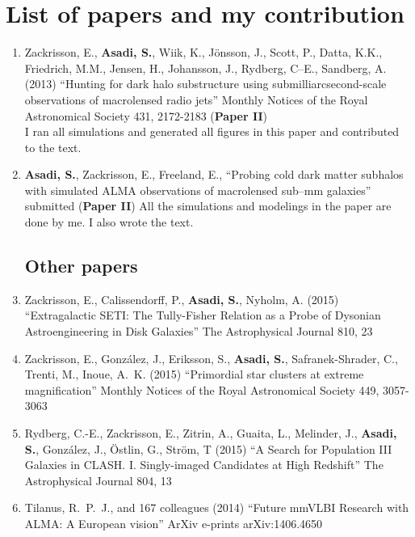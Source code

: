 \documentclass[a4wide,12pt]{book}
\begin{document}
\clearpage

\thispagestyle{empty}

\section*{List of papers and my contribution}
  \begin{enumerate}[I]
    \subsection*{Included in this thesis}
      \item
      Zackrisson, E., {\bf Asadi, S.}, Wiik, K., J{\"o}nsson, J., Scott, P., Datta, K.K., Friedrich, M.M., Jensen, H., Johansson, J., Rydberg, C--E., Sandberg, A. (2013) ``Hunting for dark halo substructure using  submilliarcsecond-scale observations of macrolensed radio jets'' Monthly Notices of the Royal Astronomical Society 431, 2172-2183 ({\bf Paper II})\\
      I ran all simulations and generated all figures in this paper and contributed to the text.
      \item 
      {\bf Asadi, S.}, Zackrisson, E., Freeland, E., ``Probing cold dark matter subhalos with simulated ALMA observations of macrolensed sub–mm galaxies'' submitted ({\bf Paper II})
      All the simulations and modelings in the paper are done by me. I also wrote the text.
    \subsection*{Other papers}
      \item
      Zackrisson, E., Calissendorff, P., {\bf Asadi, S.}, Nyholm, A. (2015) ``Extragalactic SETI: The Tully-Fisher Relation as a Probe of Dysonian Astroengineering in Disk Galaxies'' The Astrophysical Journal 810, 23
      \item
      Zackrisson, E., Gonz{\'a}lez, J., Eriksson, S., {\bf Asadi, S.}, Safranek-Shrader, C., Trenti, M., Inoue, A.~K. (2015) ``Primordial star clusters at extreme magnification'' Monthly Notices of the Royal Astronomical Society 449, 3057-3063
      \item 
      Rydberg, C.-E., Zackrisson, E., Zitrin, A., Guaita, L., Melinder, J., {\bf Asadi, S.}, Gonz{\'a}lez, J., {\"O}stlin, G., Str{\"o}m, T (2015) ``A Search for Population III Galaxies in CLASH. I. Singly-imaged Candidates at High Redshift'' The Astrophysical Journal 804, 13
      \item 
      Tilanus, R.~P.~J., and 167 colleagues (2014) ``Future mmVLBI Research with ALMA: A European vision'' ArXiv e-prints arXiv:1406.4650
  \end{enumerate}
\end{document}
